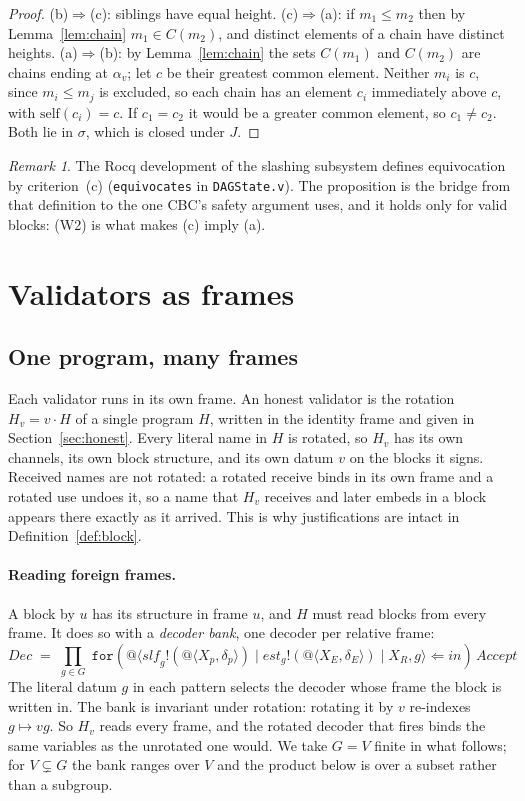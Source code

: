 \documentclass[11pt]{article}
\makeatletter
\theoremstyle{definition}
\theoremstyle{remark}
\newtheorem{remark}[theorem]{Remark}
\newcommand{\prcv}[3]{\mathtt{for}(#1 \Leftarrow #2)#3}
\newcommand{\snd}[2]{#1!(#2)}
\newcommand{\qn}[2]{@\langle #1, #2\rangle}
\newcommand{\act}[2]{#1\cdot #2}
\newcommand{\slf}{\mathrm{self}}
\makeatother
\begin{document}
\begin{proof}
(b)$\Rightarrow$(c): siblings have equal height. (c)$\Rightarrow$(a): if
$m_1\le m_2$ then by Lemma~\ref{lem:chain} $m_1\in C(m_2)$, and distinct
elements of a chain have distinct heights. (a)$\Rightarrow$(b): by
Lemma~\ref{lem:chain} the sets $C(m_1)$ and $C(m_2)$ are chains ending at
$\alpha_v$; let $c$ be their greatest common element. Neither $m_i$ is $c$,
since $m_i\le m_j$ is excluded, so each chain has an element $c_i$ immediately
above $c$, with $\slf(c_i)=c$. If $c_1=c_2$ it would be a greater common
element, so $c_1\ne c_2$. Both lie in $\sigma$, which is closed under $J$.
\end{proof}

\begin{remark}
The Rocq development of the slashing subsystem defines equivocation by
criterion~(c) (\texttt{equivocates} in \texttt{DAGState.v}). The proposition
is the bridge from that definition to the one CBC's safety argument uses, and
it holds only for valid blocks: (W2) is what makes (c) imply (a).
\end{remark}

\section{Validators as frames}\label{sec:frames}

\subsection{One program, many frames}

Each validator runs in its own frame. An honest validator is the rotation
$H_v=\act{v}{H}$ of a single program $H$, written in the identity frame and
given in Section~\ref{sec:honest}. Every literal name in $H$ is rotated, so
$H_v$ has its own channels, its own block structure, and its own datum $v$ on
the blocks it signs. Received names are not rotated: a rotated receive binds
in its own frame and a rotated use undoes it, so a name that $H_v$ receives and
later embeds in a block appears there exactly as it arrived. This is why
justifications are intact in Definition~\ref{def:block}.

\paragraph{Reading foreign frames.}
A block by $u$ has its structure in frame $u$, and $H$ must read blocks from
every frame. It does so with a \emph{decoder bank}, one decoder per relative
frame:
\[
\mathit{Dec}\;=\;\textstyle\prod_{g\in G}\;
\prcv{\qn{\snd{\mathit{slf}_g}{\qn{X_p}{\delta_p}}\mid
\snd{\mathit{est}_g}{\qn{X_E}{\delta_E}}\mid X_R}{g}}{\mathit{in}}{\,\mathit{Accept}}
\]
The literal datum $g$ in each pattern selects the decoder whose frame the block
is written in. The bank is invariant under rotation: rotating it by $v$
re-indexes $g\mapsto vg$. So $H_v$ reads every frame, and the rotated decoder
that fires binds the same variables as the unrotated one would. We take
$G=V$ finite in what follows; for $V\subsetneq G$ the bank ranges over $V$
and the product below is over a subset rather than a subgroup.
\end{document}
